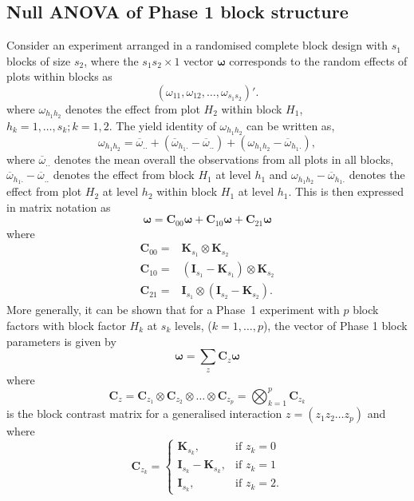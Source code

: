 \documentclass[article]{jss}
\newcommand{\I}{\mathbf{I}}
\newcommand{\K}{\mathbf{K}}
\newcommand{\C}{\mathbf{C}}
\begin{document}
\subsection{Null ANOVA of Phase 1 block structure}
Consider an experiment arranged in a randomised complete block design with $s_1$ blocks of size $s_2$, where the $s_1s_2 \times 1$ vector $\bm{\omega}$ corresponds to the random effects of plots within blocks as  
\begin{equation}\label{eq:blockParSplitBlk1}
 (\omega_{11}, \omega_{12}, \dots, \omega_{s_1 s_2})'. 
\end{equation}
where $\omega_{h_1 h_2}$ denotes the effect from plot $H_2$ within block $H_1$, $h_k = 1, \dots, s_k; k = 1, 2$. The yield identity of $\omega_{h_1 h_2}$ can be written as,
\begin{equation}
\label{eq:yieldIdentityNest}
\omega_{h_1 h_2} = \overline{\omega}_{..}+(\overline{\omega}_{h_1 .} -\overline{\omega}_{..}) + (\omega_{h_1 h_2} - \overline{\omega}_{h_1 .}),
\end{equation}
where $\overline{\omega}_{..}$ denotes the mean overall the observations from all plots in all blocks, $\overline{\omega}_{h_1 .} -\overline{\omega}_{..}$ denotes the effect from block $H_1$ at level $h_1$ and $\omega_{h_1 h_2} - \overline{\omega}_{h_1 .}$ denotes the effect from plot $H_2$ at level $h_2$ within block $H_1$ at level $h_1$. This is then expressed in matrix notation as 
\[
\bm{\omega} = \C_{00} \bm{\omega} + \C_{10}\bm{\omega} + \C_{21}\bm{\omega}
\]
where
\begin{eqnarray}
\nonumber \C_{00} = & \K_{s_1} \otimes \K_{s_2}\\
\nonumber \C_{10} = &  (\I_{s_1} - \K_{s_1}) \otimes \K_{s_2} \\
\nonumber \C_{21} = &  \I_{s_1} \otimes (\I_{s_2} - \K_{s_2}).
\end{eqnarray}
More generally, it can be shown that for a Phase~1 experiment with $p$ block factors with block factor $H_k$ at $s_k$ levels, ($k = 1, \dots, p$), the vector of Phase 1 block parameters is given by 
\begin{equation}
\bm{\omega} = \sum_z{\C_{z}\bm{\omega}}
\end{equation}
where 
\[
\C_{z} =  \C_{z_1} \otimes  \C_{z_2} \otimes \dots \otimes  \C_{z_{p}} = \bigotimes^{p} _{k = 1} \C_{z_k}
\]
is the block contrast matrix for a generalised interaction $z = (z_1 z_2 \dots z_{p})$ and where 
\begin{equation}
\label{eq:contrMat1}
\C_{z_k} =
   \begin{cases}
       \K_{s_k}, & \mbox{if } z_k = 0 \\
       \I_{s_k} - \K_{s_k}, & \mbox{if } z_k = 1\\
        \I_{s_k}, & \mbox{if } z_k = 2.
    \end{cases}
\end{equation}
\end{document}
